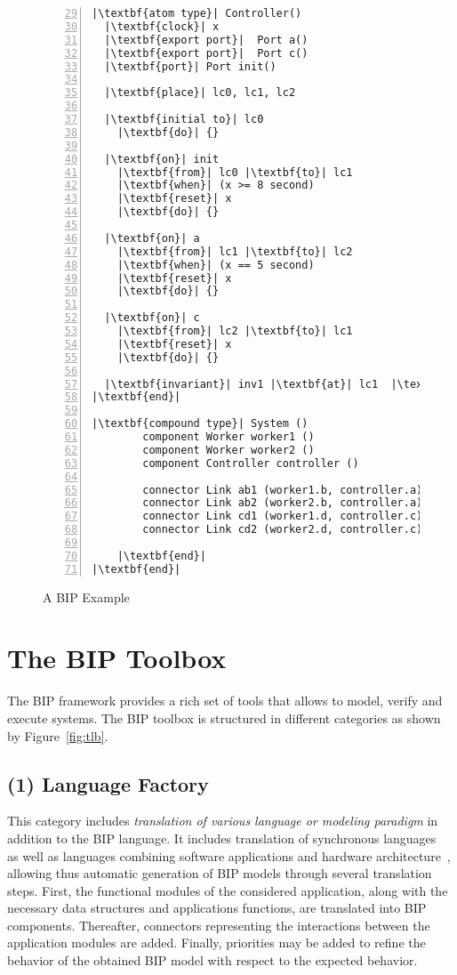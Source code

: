 \begin{figure}[H]
\begin{lstlisting}[basicstyle=\ttfamily,
escapeinside={||},
mathescape=true,
numbers=left,
backgroundcolor=\color{gray!20},
firstnumber=29]
|\textbf{atom type}| Controller()
  |\textbf{clock}| x 
  |\textbf{export port}|  Port a()
  |\textbf{export port}|  Port c()
  |\textbf{port}| Port init()

  |\textbf{place}| lc0, lc1, lc2

  |\textbf{initial to}| lc0
    |\textbf{do}| {}
  
  |\textbf{on}| init
    |\textbf{from}| lc0 |\textbf{to}| lc1
    |\textbf{when}| (x >= 8 second) 
    |\textbf{reset}| x
    |\textbf{do}| {}

  |\textbf{on}| a
    |\textbf{from}| lc1 |\textbf{to}| lc2
    |\textbf{when}| (x == 5 second)
    |\textbf{reset}| x
    |\textbf{do}| {}

  |\textbf{on}| c
    |\textbf{from}| lc2 |\textbf{to}| lc1
    |\textbf{reset}| x
    |\textbf{do}| {}

  |\textbf{invariant}| inv1 |\textbf{at}| lc1  |\textbf{when}| (x<= 5 second) 
|\textbf{end}|

|\textbf{compound type}| System ()
        component Worker worker1 ()
        component Worker worker2 ()
        component Controller controller ()
    
        connector Link ab1 (worker1.b, controller.a)
        connector Link ab2 (worker2.b, controller.a)
        connector Link cd1 (worker1.d, controller.c)
        connector Link cd2 (worker2.d, controller.c)
    
    |\textbf{end}|
|\textbf{end}|

\end{lstlisting}
\caption{A BIP Example}
\label{lst:bip}
\end{figure}
\section{The BIP Toolbox}
The BIP framework provides a rich set of tools that allows to model, verify and execute 
systems. The BIP toolbox is structured in different categories as shown by Figure~\ref{fig:tlb}.


\subsection*{(1) Language Factory}
This category includes \emph{translation of various language or modeling paradigm} 
in addition to the BIP language. It includes translation of synchronous 
languages~\cite{imp:lustre,imp:sim} as well as languages combining software applications
and hardware architecture~\cite{imp:aadl,imp:tinyos,imp:dol}, allowing thus automatic generation 
of BIP models through several translation steps. 
First, the functional modules of the considered application, along
with the necessary data structures and applications functions, are translated into 
BIP components.  Thereafter, connectors representing the interactions between the application
modules are added. Finally, priorities may be added to refine the behavior of the obtained
BIP model with respect to the expected behavior.

